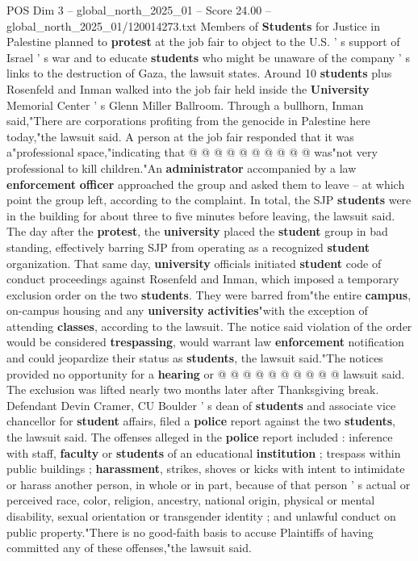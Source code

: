 \begin{textsample}{POS Dim 3 – global\_north\_2025\_01 – Score 24.00 – global\_north\_2025\_01/120014273.txt}
Members of \textbf{Students} for Justice in Palestine planned to \textbf{protest} at the job fair to object to the U.S. ' s support of Israel ' s war and to educate \textbf{students} who might be unaware of the company ' s links to the destruction of Gaza, the lawsuit states.
Around 10 \textbf{students} plus Rosenfeld and Inman walked into the job fair held inside the \textbf{University} Memorial Center ' s Glenn Miller Ballroom.
Through a bullhorn, Inman said,"There are corporations profiting from the genocide in Palestine here today,"the lawsuit said.
A person at the job fair responded that it was a"professional space,"indicating that @ @ @ @ @ @ @ @ @ @ was"not very professional to kill children."An \textbf{administrator} accompanied by a law \textbf{enforcement} \textbf{officer} approached the group and asked them to leave -- at which point the group left, according to the complaint.
In total, the SJP \textbf{students} were in the building for about three to five minutes before leaving, the lawsuit said.
The day after the \textbf{protest}, the \textbf{university} placed the \textbf{student} group in bad standing, effectively barring SJP from operating as a recognized \textbf{student} organization.
That same day, \textbf{university} officials initiated \textbf{student} code of conduct proceedings against Rosenfeld and Inman, which imposed a temporary exclusion order on the two \textbf{students}.
They were barred from"the entire \textbf{campus}, on-campus housing and any \textbf{university} \textbf{activities}"with the exception of attending \textbf{classes}, according to the lawsuit.
The notice said violation of the order would be considered \textbf{trespassing}, would warrant law \textbf{enforcement} notification and could jeopardize their status as \textbf{students}, the lawsuit said."The notices provided no opportunity for a \textbf{hearing} or @ @ @ @ @ @ @ @ @ @ lawsuit said.
The exclusion was lifted nearly two months later after Thanksgiving break.
Defendant Devin Cramer, CU Boulder ' s dean of \textbf{students} and associate vice chancellor for \textbf{student} affairs, filed a \textbf{police} report against the two \textbf{students}, the lawsuit said.
The offenses alleged in the \textbf{police} report included : inference with staff, \textbf{faculty} or \textbf{students} of an educational \textbf{institution} ; trespass within public buildings ; \textbf{harassment}, strikes, shoves or kicks with intent to intimidate or harass another person, in whole or in part, because of that person ' s actual or perceived race, color, religion, ancestry, national origin, physical or mental disability, sexual orientation or transgender identity ; and unlawful conduct on public property."There is no good-faith basis to accuse Plaintiffs of having committed any of these offenses,"the lawsuit said.

\end{textsample}
